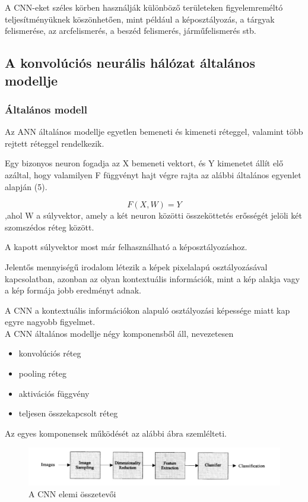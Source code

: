 \documentclass[12pt,a4]{article}
\begin{document}
	
	A CNN-eket széles körben használják különböző területeken figyelemreméltó
	teljesítményüknek köszönhetően, mint például a képosztályozás, a tárgyak felismerése, az arcfelismerés, a beszéd
	felismerés, járműfelismerés stb.
	
	\subsection{A konvolúciós neurális hálózat általános modellje}
	
	\subsubsection{Általános modell}
	Az ANN általános modellje \cite{CNN} egyetlen bemeneti és kimeneti réteggel,
	valamint több rejtett réteggel rendelkezik.
	
	Egy bizonyos 
	neuron fogadja az X bemeneti vektort, és Y kimenetet állít elő azáltal,
	hogy valamilyen F függvényt hajt végre rajta az alábbi általános egyenlet alapján (5).
	\begin{mdframed}
	\begin{equation}
			F(X, W) = Y
	\end{equation}
	,ahol W a súlyvektor, amely a két neuron közötti összeköttetés erősségét jelöli két szomszédos réteg között.
 	\end{mdframed}

	A kapott súlyvektor most már felhasználható a képosztályozáshoz.
	
	Jelentős mennyiségű irodalom létezik a képek pixelalapú osztályozásával
	kapcsolatban, azonban az olyan kontextuális információk, mint a kép alakja vagy 
	a kép formája jobb eredményt adnak.
	
	A CNN a kontextuális információkon alapuló osztályozási képessége miatt kap egyre nagyobb figyelmet.\\
	
	
	A CNN általános modellje négy komponensből áll, nevezetesen 
	\begin{itemize}
		\item konvolúciós réteg
		\item pooling réteg
		\item aktivációs függvény
		\item teljesen összekapcsolt réteg
	\end{itemize}
	Az egyes komponensek működését az alábbi ábra szemlélteti.
	
	\begin{figure}[h]	
		\centering
		\includegraphics[width=1\linewidth]{element}
		\caption{\cite{CNN} A CNN elemi összetevői}
	\end{figure}
\end{document}
